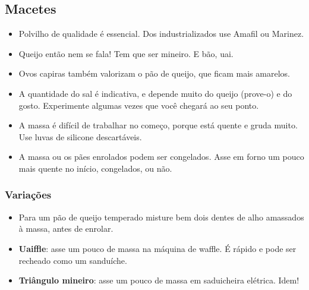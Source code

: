 \subsection*{Macetes}
\begin{itemize}
\item Polvilho de qualidade é essencial. Dos industrializados use Amafil ou Marinez.
\item Queijo então nem se fala! Tem que ser mineiro. E bão, uai.
\item Ovos capiras também valorizam o pão de queijo, que ficam mais amarelos.
\item A quantidade do sal é indicativa, e depende muito do queijo (prove-o) e do gosto. Experimente algumas vezes que você chegará ao seu ponto.
\item A massa é difícil de trabalhar no começo, porque está quente e gruda muito. Use luvas de silicone descartáveis.
\item A massa ou os pães enrolados podem ser congelados. Asse em forno um pouco mais quente no início, congelados, ou não.
\end{itemize}

\subsubsection*{Variações}
\begin{itemize}
\item Para um pão de queijo temperado misture bem dois dentes de alho amassados à massa, antes de enrolar.
\item \textbf{Uaiffle}: asse um pouco de massa na máquina de waffle. É rápido e pode ser recheado como um sanduíche.
\item \textbf{Triângulo mineiro}: asse um pouco de massa em saduicheira elétrica. Idem!
\end{itemize}




  
  
  
  
  